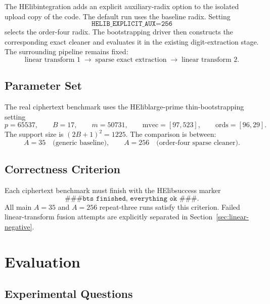 \documentclass[a4paper,runningheads]{llncs}
\newcommand{\HElib}{\textsf{HElib}}
\begin{document}
The \HElib integration adds an explicit auxiliary-radix option to the isolated
upload copy of the code.  The default run uses the baseline radix.  Setting
\[
  \texttt{HELIB\_EXPLICIT\_AUX=256}
\]
selects the order-four radix.  The bootstrapping driver then constructs the
corresponding exact cleaner and evaluates it in the existing digit-extraction
stage.  The surrounding pipeline remains fixed:
\[
  \text{linear transform 1}
  \;\rightarrow\;
  \text{sparse exact extraction}
  \;\rightarrow\;
  \text{linear transform 2}.
\]

\subsection{Parameter Set}

The real ciphertext benchmark uses the \HElib large-prime thin-bootstrapping
setting
\[
  p=65537,\qquad B=17,\qquad m=50731,\qquad
  \mathrm{mvec}=[97,523],\qquad \mathrm{ords}=[96,29].
\]
The support size is $(2B+1)^2=1225$.  The comparison is between:
\[
  A=35\quad\text{(generic baseline)},\qquad
  A=256\quad\text{(order-four sparse cleaner)}.
\]

\subsection{Correctness Criterion}

Each ciphertext benchmark must finish with the \HElib success marker
\[
  \texttt{\#\#\# bts finished, everything ok \#\#\#}.
\]
All main $A=35$ and $A=256$ repeat-three runs satisfy this criterion.  Failed
linear-transform fusion attempts are explicitly separated in
Section~\ref{sec:linear-negative}.

\section{Evaluation}
\label{sec:evaluation}

\subsection{Experimental Questions}
\end{document}
